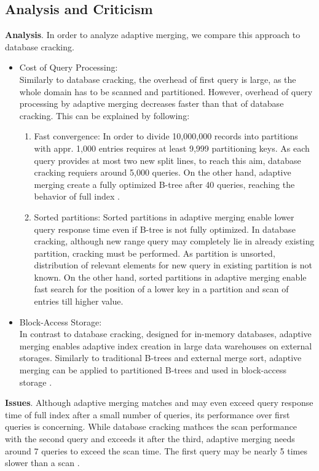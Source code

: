 \documentclass[10pt, conference, compsocconf]{IEEEtran}
\begin{document}
\subsection{Analysis and Criticism}
\textbf{Analysis}. In order to analyze adaptive merging, we compare this approach to database cracking.\\
\begin{itemize}
\item{Cost of Query Processing:} \\Similarly to database cracking, the overhead of first query is large, as the whole domain has to be scanned and partitioned. However, overhead of query processing by adaptive merging decreases faster than that of database cracking. This can be explained by following:\\
\begin{enumerate}
\item{Fast convergence}: In order to divide 10,000,000 records into partitions with appr. 1,000 entries requires at least 9,999 partitioning keys. As each query provides at most two new split lines, to reach this aim, database cracking requiers around 5,000 queries. On the other hand, adaptive merging create a fully optimized B-tree after 40 queries, reaching the behavior of full index \cite{merging}.
\item{Sorted partitions}: Sorted partitions in adaptive merging enable lower query response time even if B-tree is not fully optimized. In database cracking, although new range query may completely lie in already existing partition, cracking must be performed. As partition is unsorted, distribution of relevant elements for new query in existing partition is not known. On the other hand, sorted partitions in adaptive merging enable fast search for the position of a lower key in a partition and scan of entries till higher value.\\
\end{enumerate}
\item{Block-Access Storage:} \\ In contrast to database cracking, designed for in-memory databases, adaptive merging enables adaptive index creation in large data warehouses on external storages. Similarly to traditional B-trees and external merge sort, adaptive merging can be applied to partitioned B-trees and used in block-access storage \cite{merging}. \\
\end{itemize}

\textbf{Issues}. Although adaptive merging matches and may even exceed query response time of full index after a small number of queries, its performance over first queries is concerning. While database cracking mathces the scan performance with the second query and exceeds it after the third, adaptive merging needs around 7 queries to exceed the scan time. The first query may be nearly 5 times slower than a scan \cite{hybrid}.
\end{document}
